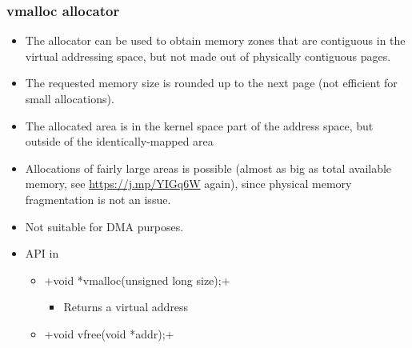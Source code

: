 \begin{frame}[fragile]
  \frametitle{vmalloc allocator}
  \begin{itemize}
  \item The  allocator can be used to obtain
    memory zones that are contiguous in the virtual addressing space,
    but not made out of physically contiguous pages.
  \item The requested memory size is rounded up to the next page (not
    efficient for small allocations).
  \item The allocated area is in the kernel space part of the address
    space, but outside of the identically-mapped area
  \item Allocations of fairly large areas is possible (almost as big
    as total available memory, see \url{https://j.mp/YIGq6W} again),
    since physical memory fragmentation is not an issue.
  \item Not suitable for DMA purposes.
  \item API in 
    \begin{itemize}
    \item {}+void *vmalloc(unsigned long size);+
      \begin{itemize}
      \item Returns a virtual address
      \end{itemize}
    \item {}+void vfree(void *addr);+
    \end{itemize}
  \end{itemize}
\end{frame}

